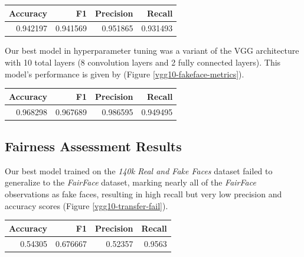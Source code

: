 \documentclass[11pt, letterpaper]{article}
\newenvironment{Figure}
  {\par\medskip\noindent\minipage{\linewidth}}
  {\endminipage\par\medskip}
\begin{document}
\begin{multicols}{2}
  \begin{Figure}
    \label{baseline-metrics}
    \begin{tabular}{rrrr}
    \toprule
     Accuracy &        F1 &  Precision &    Recall \\
    \midrule
     0.942197 &  0.941569 &   0.951865 &  0.931493 \\
    \bottomrule
    \end{tabular}
  \end{Figure}

  Our best model in hyperparameter tuning was a variant of the VGG architecture
  \cite{simonyan2015deep} with 10 total layers (8 convolution layers and 2 fully
  connected layers). This model's performance is given by
  (Figure \ref{vgg10-fakeface-metrics}).

  \begin{Figure}
    \centering
    \label{vgg10-fakeface-metrics}
    \begin{tabular}{rrrr}
    \toprule
     Accuracy &        F1 &  Precision &    Recall \\
    \midrule
     0.968298 &  0.967689 &   0.986595 &  0.949495 \\
    \bottomrule
    \end{tabular}
  \end{Figure}


  \subsection{Fairness Assessment Results}

  Our best model trained on the \emph{140k Real and Fake Faces}
  dataset failed to generalize to the \emph{FairFace} dataset, marking
  nearly all of the \emph{FairFace} observations as fake faces,
  resulting in high recall but very low precision and accuracy scores
  (Figure \ref{vgg10-transfer-fail}).

  \begin{Figure}
    \centering {}
    \label{vgg10-transfer-fail}
    \begin{tabular}{rrrr}
    \toprule
    Accuracy &        F1 &  Precision &  Recall \\
    \midrule
      0.54305 &  0.676667 &    0.52357 &  0.9563 \\
    \bottomrule
    \end{tabular}
  \end{Figure}


\end{multicols}
\end{document}
